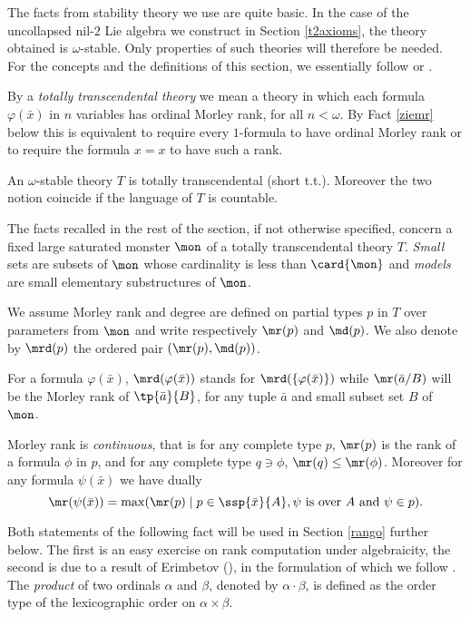 The facts from stability theory we use are quite basic.
In the case of the uncollapsed nil-$2$ Lie algebra we construct in Section \ref{t2axioms}, the theory obtained is $\omega$-stable.
Only properties of such theories will therefore be needed. For the concepts and the definitions of this section,
we essentially follow \cite{ziebous} or \cite{zietent}.

\medskip
By a {\em totally transcendental theory} we mean a theory in which each formula $\varphi(\bar x)$
in $n$ variables has ordinal Morley rank, for all $n<\omega$.
By Fact \ref{ziemr} below this is equivalent to require every $1$-formula to have ordinal Morley rank or
to require the formula $x=x$ to have such a rank.
\begin{fact*}
An $\omega$-stable theory $T$ is totally transcendental (short t.t.). Moreover the two notion coincide
if the language of $T$ is countable.
\end{fact*}
The facts recalled in the rest of the section, if not otherwise specified, concern a fixed large saturated monster $\mon$ of
a totally transcendental theory $T$.
{\em Small} sets are subsets of $\mon$ whose cardinality is less than $\card{\mon}$ and {\em models} are
small elementary substructures of $\mon$.

We assume Morley rank and degree are defined on partial types $p$ in $T$ over parameters from $\mon$
and write respectively $\mr(p)$ and $\md(p)$. We also denote by $\mrd(p)$ the ordered pair $(\mr(p),\md(p))$.

For a formula $\varphi(\bar x)$, $\mrd(\varphi(\bar x))$ stands for $\mrd(\{\varphi(\bar x)\})$ while $\mr(\bar a/B)$ will be the Morley rank of $\tp{\bar a}{B}$, for any tuple $\bar a$ and small subset set $B$ of $\mon$.

\begin{rem}\label{belrango}
Morley rank is {\em continuous}, that is for any complete type $p$, $\mr(p)$
is the rank of a formula $\phi$ in $p$, and for any complete type $q\ni\phi$, $\mr(q)\leq\mr(\phi)$.
Moreover for any formula $\psi(\bar x)$ we have dually
$$\mr(\psi(\bar x))=\max(\mr(p)\mid p\in\ssp{\bar x}{A},\psi\text{ is over $A$ and }\psi\in p).$$
\end{rem}

\smallskip
Both statements of the following fact will be used in Section \ref{rango} further below.
The first is an easy exercise on rank computation under
algebraicity, the second is due to a result of Erimbetov (\cite{eri}), in the formulation of which we follow \cite{ziemr}.
The {\em product} of two ordinals $\alpha$ and $\beta$, denoted by $\alpha\cdot\beta$, is defined as
the order type of the lexicographic order on $\alpha\times\beta$.


